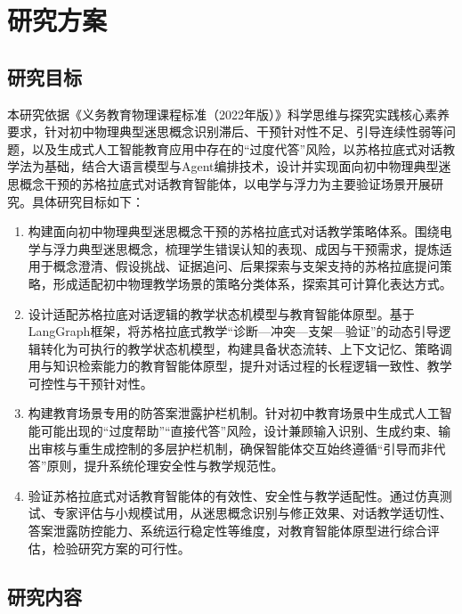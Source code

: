 \chapter{研究方案}
\label{chap:research-proposal}

\section{研究目标}

本研究依据《义务教育物理课程标准（2022年版）》科学思维与探究实践核心素养要求，针对初中物理典型迷思概念识别滞后、干预针对性不足、引导连续性弱等问题，以及生成式人工智能教育应用中存在的“过度代答”风险，以苏格拉底式对话教学法为基础，结合大语言模型与Agent编排技术，设计并实现面向初中物理典型迷思概念干预的苏格拉底式对话教育智能体，以电学与浮力为主要验证场景开展研究。具体研究目标如下：

\begin{enumerate}
    \item 构建面向初中物理典型迷思概念干预的苏格拉底式对话教学策略体系。围绕电学与浮力典型迷思概念，梳理学生错误认知的表现、成因与干预需求，提炼适用于概念澄清、假设挑战、证据追问、后果探索与支架支持的苏格拉底提问策略，形成适配初中物理教学场景的策略分类体系，探索其可计算化表达方式。

    \item 设计适配苏格拉底对话逻辑的教学状态机模型与教育智能体原型。基于LangGraph框架，将苏格拉底式教学“诊断—冲突—支架—验证”的动态引导逻辑转化为可执行的教学状态机模型，构建具备状态流转、上下文记忆、策略调用与知识检索能力的教育智能体原型，提升对话过程的长程逻辑一致性、教学可控性与干预针对性。

    \item 构建教育场景专用的防答案泄露护栏机制。针对初中教育场景中生成式人工智能可能出现的“过度帮助”“直接代答”风险，设计兼顾输入识别、生成约束、输出审核与重生成控制的多层护栏机制，确保智能体交互始终遵循“引导而非代答”原则，提升系统伦理安全性与教学规范性。

    \item 验证苏格拉底式对话教育智能体的有效性、安全性与教学适配性。通过仿真测试、专家评估与小规模试用，从迷思概念识别与修正效果、对话教学适切性、答案泄露防控能力、系统运行稳定性等维度，对教育智能体原型进行综合评估，检验研究方案的可行性。
\end{enumerate}

\section{研究内容}

